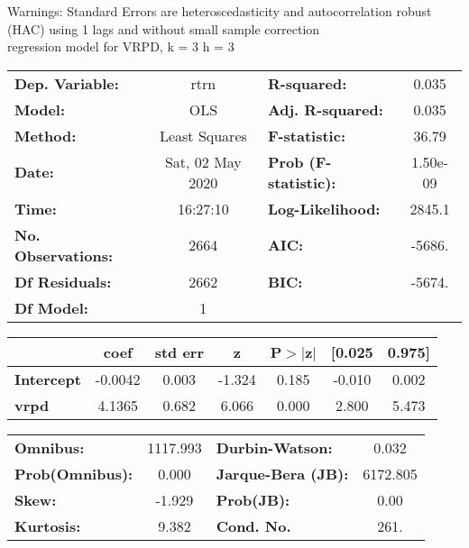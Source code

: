 Warnings: \newline
 [1] Standard Errors are heteroscedasticity and autocorrelation robust (HAC) using 1 lags and without small sample correction\\ 

regression model for VRPD, k = 3 h = 3\begin{center}
\begin{tabular}{lclc}
\toprule
\textbf{Dep. Variable:}    &       rtrn       & \textbf{  R-squared:         } &     0.035   \\
\textbf{Model:}            &       OLS        & \textbf{  Adj. R-squared:    } &     0.035   \\
\textbf{Method:}           &  Least Squares   & \textbf{  F-statistic:       } &     36.79   \\
\textbf{Date:}             & Sat, 02 May 2020 & \textbf{  Prob (F-statistic):} &  1.50e-09   \\
\textbf{Time:}             &     16:27:10     & \textbf{  Log-Likelihood:    } &    2845.1   \\
\textbf{No. Observations:} &        2664      & \textbf{  AIC:               } &    -5686.   \\
\textbf{Df Residuals:}     &        2662      & \textbf{  BIC:               } &    -5674.   \\
\textbf{Df Model:}         &           1      & \textbf{                     } &             \\
\bottomrule
\end{tabular}
\begin{tabular}{lcccccc}
                   & \textbf{coef} & \textbf{std err} & \textbf{z} & \textbf{P$> |$z$|$} & \textbf{[0.025} & \textbf{0.975]}  \\
\midrule
\textbf{Intercept} &      -0.0042  &        0.003     &    -1.324  &         0.185        &       -0.010    &        0.002     \\
\textbf{vrpd}      &       4.1365  &        0.682     &     6.066  &         0.000        &        2.800    &        5.473     \\
\bottomrule
\end{tabular}
\begin{tabular}{lclc}
\textbf{Omnibus:}       & 1117.993 & \textbf{  Durbin-Watson:     } &    0.032  \\
\textbf{Prob(Omnibus):} &   0.000  & \textbf{  Jarque-Bera (JB):  } & 6172.805  \\
\textbf{Skew:}          &  -1.929  & \textbf{  Prob(JB):          } &     0.00  \\
\textbf{Kurtosis:}      &   9.382  & \textbf{  Cond. No.          } &     261.  \\
\bottomrule
\end{tabular}
\end{center}

